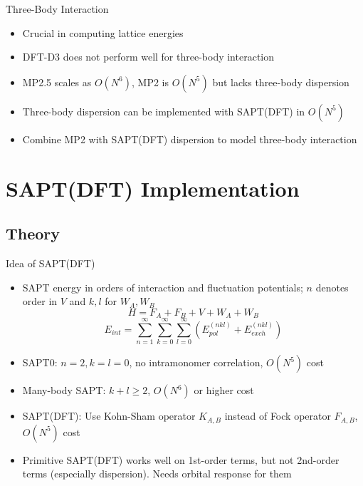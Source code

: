 \documentclass{beamer}
\begin{document}
    \begin{frame}{Three-Body Interaction}
        \begin{itemize}
            \item Crucial in computing lattice energies
            \item DFT-D3 does not perform well for three-body interaction
            \item MP2.5 scales as $O(N^6)$, MP2 is $O(N^5)$ but lacks three-body dispersion
            \item Three-body dispersion can be implemented with SAPT(DFT) in $O(N^5)$
            \item Combine MP2 with SAPT(DFT) dispersion to model three-body interaction  
        \end{itemize}   
    \end{frame}

\section{SAPT(DFT) Implementation}
    
    \subsection{Theory}
             
        \begin{frame}{Idea of SAPT(DFT)}
            \begin{itemize}
                \item SAPT energy in orders of interaction and fluctuation potentials; $n$ denotes order in $V$ and $k,l$ for $W_A, W_B$
                $$H = F_A + F_B + V + W_A + W_B$$
                $$E_{int} = \sum_{n=1}^\infty \sum_{k=0}^\infty \sum_{l=0}^\infty \left(E_{pol}^{(nkl)} + E_{exch}^{(nkl)}\right)$$
                \item SAPT0: $n = 2, k = l = 0$, no intramonomer correlation, $O(N^5)$ cost
                \item Many-body SAPT: $k+l \geq 2$, $O(N^6)$ or higher cost
                \item SAPT(DFT): Use Kohn-Sham operator $K_{A,B}$ instead of Fock operator $F_{A,B}$, $O(N^5)$ cost
                \item Primitive SAPT(DFT) works well on 1st-order terms, but not 2nd-order terms (especially dispersion). Needs orbital response for them
            \end{itemize}
        \end{frame}
\end{document}

